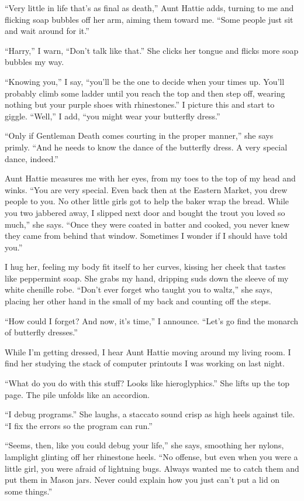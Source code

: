 \documentclass[twoside,10pt]{book}
\begin{document}
``Very little in life that's as final as death,'' Aunt Hattie adds,
turning to me and flicking soap bubbles off her arm, aiming them toward
me. ``Some people just sit and wait around for it.''

``Harry,'' I warn, ``Don't talk like that.'' She clicks her tongue and
flicks more soap bubbles my way.

``Knowing you,'' I say, ``you'll be the one to decide when your times
up. You'll probably climb some ladder until you reach the top and then
step off, wearing nothing but your purple shoes with rhinestones.'' I
picture this and start to giggle. ``Well,'' I add, ``you might wear your
butterfly dress.''

``Only if Gentleman Death comes courting in the proper manner,'' she
says primly. ``And he needs to know the dance of the butterfly dress. A
very special dance, indeed.''

Aunt Hattie measures me with her eyes, from my toes to the top of my
head and winks. ``You are very special. Even back then at the Eastern
Market, you drew people to you. No other little girls got to help the
baker wrap the bread. While you two jabbered away, I slipped next door
and bought the trout you loved so much,'' she says. ``Once they were
coated in batter and cooked, you never knew they came from behind that
window. Sometimes I wonder if I should have told you.''

I hug her, feeling my body fit itself to her curves, kissing her cheek
that tastes like peppermint soap. She grabs my hand, dripping suds down
the sleeve of my white chenille robe. ``Don't ever forget who taught you
to waltz,'' she says, placing her other hand in the small of my back and
counting off the steps.

``How could I forget? And now, it's time,'' I announce. ``Let's go find
the monarch of butterfly dresses.''

While I'm getting dressed, I hear Aunt Hattie moving around my living
room. I find her study­ing the stack of computer printouts I was working
on last night.

``What do you do with this stuff? Looks like hieroglyphics.'' She lifts
up the top page. The pile unfolds like an accordion.

``I debug programs.'' She laughs, a staccato sound crisp as high heels
against tile. ``I fix the errors so the program can run.''

``Seems, then, like you could debug your life,'' she says, smoothing her
nylons, lamplight glinting off her rhinestone heels. ``No offense, but
even when you were a little girl, you were afraid of lightning bugs.
Always wanted me to catch them and put them in Mason jars. Never could
explain how you just can't put a lid on some things.''
\end{document}

